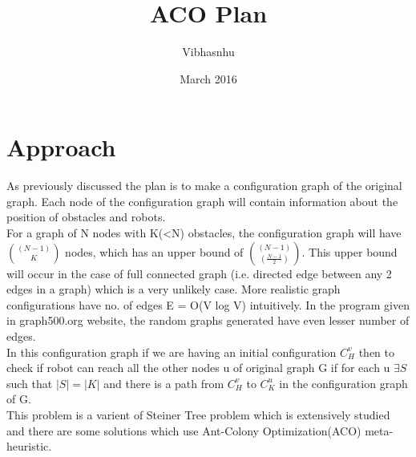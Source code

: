 \documentclass{article}
\title{ACO Plan}
\author{Vibhasnhu }
\date{March 2016}
\begin{document}
\maketitle

\section{Approach}
As previously discussed the plan is to make a configuration graph of the original graph. Each node of the configuration graph will contain information about the position of obstacles and robots. \\
For a graph of N nodes with K(<N) obstacles, the configuration graph will have ${(N-1) \choose K}$ nodes, which has an upper bound of ${(N-1) \choose (\frac{N-1}{2})}$. This upper bound will occur in the case of full connected graph (i.e. directed edge between any 2 edges in a graph) which is a very unlikely case. More realistic graph configurations have no. of edges E = O(V log V) intuitively. In the program given in graph500.org website, the random graphs generated have even lesser number of edges. \\

In this configuration graph if we are having an initial configuration $ C^v_H $ then to check if robot can reach all the other nodes u of original graph G if for each u $\exists S$ such that $ |S| = |K| $ and there is a path from $C^v_H$ to $C^u_K$ in the configuration graph of G.\\
This problem is a varient of Steiner Tree problem which is extensively studied and there are some solutions which use Ant-Colony Optimization(ACO) meta-heuristic. \\
\end{document}
